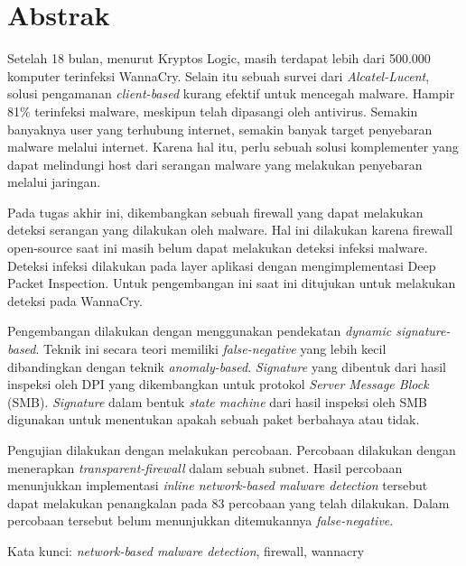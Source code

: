 \clearpage
\chapter*{Abstrak}

Setelah 18 bulan, menurut Kryptos Logic, masih terdapat lebih dari 500.000 komputer terinfeksi WannaCry. Selain itu sebuah survei dari \textit{Alcatel-Lucent}, solusi pengamanan \textit{client-based} kurang efektif untuk mencegah malware. Hampir 81\% terinfeksi malware, meskipun telah dipasangi oleh antivirus. Semakin banyaknya user yang terhubung internet, semakin banyak target penyebaran malware melalui internet. Karena hal itu, perlu sebuah solusi komplementer yang dapat melindungi host dari serangan malware yang melakukan penyebaran melalui jaringan.

Pada tugas akhir ini, dikembangkan sebuah firewall yang dapat melakukan deteksi serangan yang dilakukan oleh malware. Hal ini dilakukan karena firewall open-source saat ini masih belum dapat melakukan deteksi infeksi malware. Deteksi infeksi dilakukan pada layer aplikasi dengan mengimplementasi Deep Packet Inspection. Untuk pengembangan ini saat ini ditujukan untuk melakukan deteksi pada WannaCry.

Pengembangan dilakukan dengan menggunakan pendekatan \textit{dynamic signature-based}. Teknik ini secara teori memiliki \textit{false-negative} yang lebih kecil dibandingkan dengan teknik \textit{anomaly-based}. \textit{Signature} yang dibentuk dari hasil inspeksi oleh DPI yang dikembangkan untuk protokol \textit{Server Message Block} (SMB). \textit{Signature} dalam bentuk \textit{state machine} dari hasil inspeksi oleh SMB digunakan untuk menentukan apakah sebuah paket berbahaya atau tidak.

Pengujian dilakukan dengan melakukan percobaan. Percobaan dilakukan dengan menerapkan \textit{transparent-firewall} dalam sebuah subnet. Hasil percobaan menunjukkan implementasi \textit{inline network-based malware detection} tersebut dapat melakukan penangkalan pada 83 percobaan yang telah dilakukan. Dalam percobaan tersebut belum menunjukkan ditemukannya \textit{false-negative}.

\vspace{17px} \noindent Kata kunci: \textit{network-based malware detection}, firewall, wannacry

\clearpage